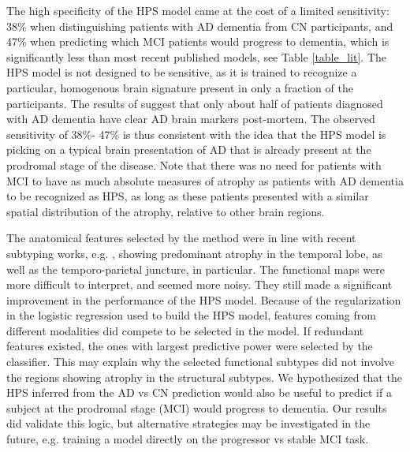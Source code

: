 \documentclass[authoryear]{elsarticle}
\begin{document}
The high specificity of the HPS model came at the cost of a limited sensitivity: 38\% when distinguishing patients with AD dementia from CN participants, and 47\% when predicting which MCI patients would progress to dementia, which is significantly less than most recent published models, see Table \ref{table_lit}. The HPS model is not designed to be sensitive, as it is trained to recognize a particular, homogenous brain signature present in only a fraction of the participants. The results of \citep{Beach2012} suggest that only about half of patients diagnosed with AD dementia have clear AD brain markers post-mortem. The observed sensitivity of 38\%- 47\% is thus consistent with the idea that the HPS model is picking on a typical brain presentation of AD that is already present at the prodromal stage of the disease. Note that there was no need for patients with MCI to have as much absolute measures of atrophy as patients with AD dementia to be recognized as HPS, as long as these patients presented with a similar spatial distribution of the atrophy, relative to other brain regions. 

The anatomical features selected by the method were in line with recent subtyping works, e.g. \citep{Hwang2015}, showing predominant atrophy in the temporal lobe, as well as the temporo-parietal juncture, in particular. The functional maps were more difficult to interpret, and seemed more noisy. They still made a significant improvement in the performance of the HPS model. Because of the regularization in the logistic regression used to build the HPS model, features coming from different modalities did compete to be selected in the model. If redundant features existed, the ones with largest predictive power were selected by the classifier. This may explain why the selected functional subtypes did not involve the regions showing atrophy in the structural subtypes. We hypothesized that the HPS inferred from the AD vs CN prediction would also be useful to predict if a subject at the prodromal stage (MCI) would progress to dementia. Our results did validate this logic, but alternative strategies may be investigated in the future, e.g. training a model directly on the progressor vs stable MCI task. 
\end{document}
